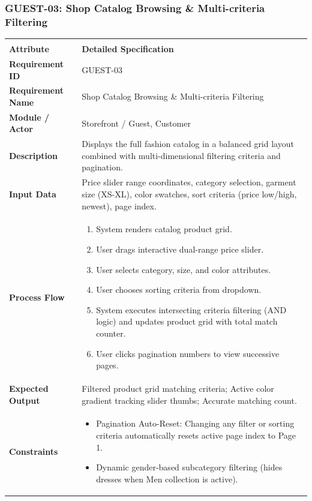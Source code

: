 \documentclass[12pt,a4paper,oneside]{report}
\begin{document}
\subsubsection{GUEST-03: Shop Catalog Browsing \& Multi-criteria Filtering}
\begin{longtable}{|p{3.6cm}|p{11.9cm}|}
\hline
\rowcolor{PrimaryBrown}
\multicolumn{2}{|p{15.5cm}|}{\textbf{\textcolor{white}{Functional Specification: GUEST-03 -- Shop Catalog Browsing \& Multi-criteria Filtering}}} \\
\hline
\endfirsthead
\hline
\rowcolor{PrimaryBrown}
\multicolumn{2}{|p{15.5cm}|}{\textbf{\textcolor{white}{Functional Specification: GUEST-03 (Continued)}}} \\
\hline
\textbf{Attribute} & \textbf{Detailed Specification} \\
\hline
\endhead
\hline
\endfoot
\textbf{Requirement ID} & GUEST-03 \\
\hline
\textbf{Requirement Name} & Shop Catalog Browsing \& Multi-criteria Filtering \\
\hline
\textbf{Module / Actor} & Storefront / Guest, Customer \\
\hline
\textbf{Description} & Displays the full fashion catalog in a balanced grid layout combined with multi-dimensional filtering criteria and pagination. \\
\hline
\textbf{Input Data} & Price slider range coordinates, category selection, garment size (XS-XL), color swatches, sort criteria (price low/high, newest), page index. \\
\hline
\textbf{Process Flow} & \begin{enumerate}[leftmargin=*,nosep,topsep=2pt]
  \item System renders catalog product grid.
  \item User drags interactive dual-range price slider.
  \item User selects category, size, and color attributes.
  \item User chooses sorting criteria from dropdown.
  \item System executes intersecting criteria filtering (AND logic) and updates product grid with total match counter.
  \item User clicks pagination numbers to view successive pages.
\end{enumerate} \\
\hline
\textbf{Expected Output} & Filtered product grid matching criteria; Active color gradient tracking slider thumbs; Accurate matching count. \\
\hline
\textbf{Constraints} & \begin{itemize}[leftmargin=*,nosep,topsep=2pt]
  \item Pagination Auto-Reset: Changing any filter or sorting criteria automatically resets active page index to Page 1.
  \item Dynamic gender-based subcategory filtering (hides dresses when Men collection is active).
\end{itemize} \\
\hline
\end{longtable}
\end{document}
